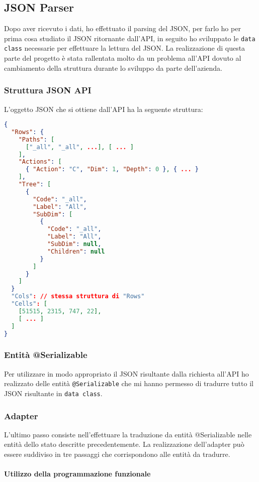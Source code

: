 \subsection{JSON Parser}
Dopo aver ricevuto i dati, ho effettuato il parsing del JSON, per farlo ho per prima cosa studiato il JSON ritornante dall'API, in seguito ho sviluppato le \verb|data class| necessarie per effettuare la lettura del JSON. La realizzazione di questa parte del progetto è stata rallentata molto da un problema all'API dovuto al cambiamento della struttura durante lo sviluppo da parte dell'azienda.  
\subsubsection{Struttura JSON API}
L'oggetto JSON che si ottiene dall'API ha la seguente struttura:
\begin{lstlisting}[caption={Struttura JSON API}, label={lst:bodycells}, language=json]
{
  "Rows": {
  	"Paths": [
  	  ["_all", "_all", ...], [ ... ]
  	],
  	"Actions": [
  	  { "Action": "C", "Dim": 1, "Depth": 0 }, { ... }
  	],
  	"Tree": [
  	  {
  	    "Code": "_all",
  	    "Label": "All",
  	    "SubDim": [
  	      {
  	        "Code": "_all",
  	        "Label": "All",
  	        "SubDim": null,
  	        "Children": null
  	      }
  	    ]  
  	  }
  	]
  }
  "Cols": // stessa struttura di "Rows"
  "Cells": [
    [51515, 2315, 747, 22],
    [ ... ]
  ]
}
\end{lstlisting}

\subsubsection{Entità @Serializable}
Per utilizzare in modo appropriato il JSON risultante dalla richiesta all'API ho realizzato delle entità \verb|@Serializable| che mi hanno permesso di tradurre tutto il JSON risultante in \verb|data class|.

\subsubsection{Adapter}
L'ultimo passo consiste nell'effettuare la traduzione da entità @Serializable nelle entità dello stato descritte precedentemente. La realizzazione dell'adapter può essere suddiviso in tre passaggi che corrispondono alle entità da tradurre.

\paragraph{Utilizzo della programmazione funzionale} \mbox{} \\

